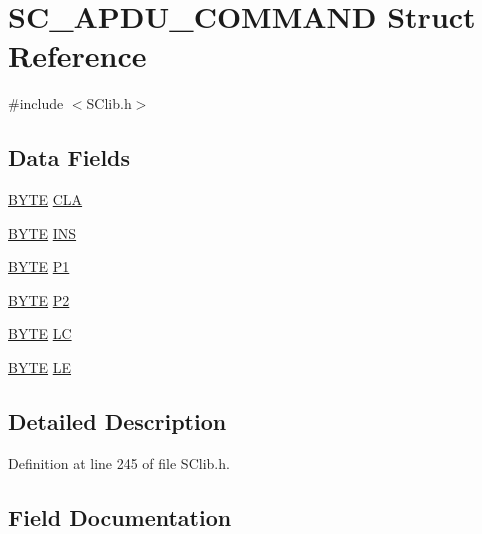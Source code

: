 \hypertarget{struct_s_c___a_p_d_u___c_o_m_m_a_n_d}{}\section{S\+C\+\_\+\+A\+P\+D\+U\+\_\+\+C\+O\+M\+M\+A\+N\+D Struct Reference}
\label{struct_s_c___a_p_d_u___c_o_m_m_a_n_d}


{\ttfamily \#include $<$S\+Clib.\+h$>$}

\subsection*{Data Fields}
\begin{DoxyCompactItemize}
\item 
\hyperlink{_generic_type_defs_8h_a4ae1dab0fb4b072a66584546209e7d58}{B\+Y\+T\+E} \hyperlink{struct_s_c___a_p_d_u___c_o_m_m_a_n_d_a0870ec244459088ba2c9df605e1f9274}{C\+L\+A}
\item 
\hyperlink{_generic_type_defs_8h_a4ae1dab0fb4b072a66584546209e7d58}{B\+Y\+T\+E} \hyperlink{struct_s_c___a_p_d_u___c_o_m_m_a_n_d_ae155fbd1927455c581741eb21a731519}{I\+N\+S}
\item 
\hyperlink{_generic_type_defs_8h_a4ae1dab0fb4b072a66584546209e7d58}{B\+Y\+T\+E} \hyperlink{struct_s_c___a_p_d_u___c_o_m_m_a_n_d_aa143074e765d90231d2eef460ef7d31c}{P1}
\item 
\hyperlink{_generic_type_defs_8h_a4ae1dab0fb4b072a66584546209e7d58}{B\+Y\+T\+E} \hyperlink{struct_s_c___a_p_d_u___c_o_m_m_a_n_d_ae3b65bb5575b73a82a168b17e12f39e3}{P2}
\item 
\hyperlink{_generic_type_defs_8h_a4ae1dab0fb4b072a66584546209e7d58}{B\+Y\+T\+E} \hyperlink{struct_s_c___a_p_d_u___c_o_m_m_a_n_d_a3572a33e255546b8031065c8681fe447}{L\+C}
\item 
\hyperlink{_generic_type_defs_8h_a4ae1dab0fb4b072a66584546209e7d58}{B\+Y\+T\+E} \hyperlink{struct_s_c___a_p_d_u___c_o_m_m_a_n_d_a1bf88a3b9f8ed74116687864981bd232}{L\+E}
\end{DoxyCompactItemize}


\subsection{Detailed Description}


Definition at line 245 of file S\+Clib.\+h.



\subsection{Field Documentation}
\hypertarget{struct_s_c___a_p_d_u___c_o_m_m_a_n_d_a0870ec244459088ba2c9df605e1f9274}{}

